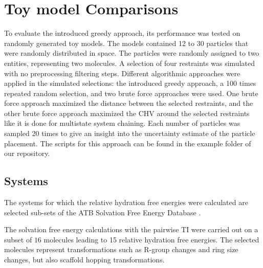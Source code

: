 
\section{Toy model Comparisons}
To evaluate the introduced greedy approach, its performance was tested on randomly generated toy models. The models contained 12 to 30 particles that were randomly distributed in space. The particles were randomly assigned to two entities, representing two molecules. A selection of four restraints was simulated with no preprocessing filtering steps. Different algorithmic approaches were applied in the simulated selections: the introduced greedy approach, a 100 times repeated random selection, and two brute force approaches were used. One brute force approach maximized the distance between the selected restraints, and the other brute force approach maximized the CHV around the selected restraints like it is done for multistate system chaining. Each number of particles was sampled 20 times to give an insight into the uncertainty estimate of the particle placement. The scripts for this approach can be found in the example folder of our repository.

\subsection{Systems}
The systems for which the relative hydration free energies were calculated are selected sub-sets of the ATB Solvation Free Energy Database \cite{Martin2018}.

The solvation free energy calculations with the pairwise TI were carried out on a subset of $16$ molecules leading to 15 relative hydration free energies. The selected molecules represent transformations such as R-group changes and ring size changes, but also scaffold hopping transformations.


